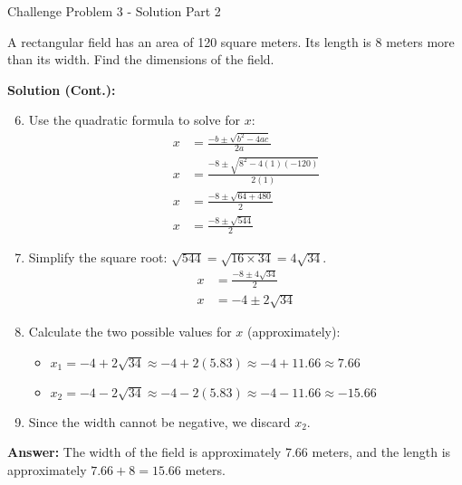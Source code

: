\documentclass[aspectratio=169]{beamer}
\begin{document}
\begin{frame}{Challenge Problem 3 - Solution Part 2}
    \begin{tcolorbox}[colback=lightgray,colframe=accent,title=Detailed Solution (Part 2)]
        \footnotesize
        A rectangular field has an area of 120 square meters. Its length is 8 meters more than its width. Find the dimensions of the field.
        
        \textbf{Solution (Cont.):}
        \begin{enumerate}
            \setcounter{enumi}{5} %
            \setlength{\itemsep}{0.5em}
            \item Use the quadratic formula to solve for $x$:
            \begin{align*}
                x &= \frac{-b \pm \sqrt{b^2 - 4ac}}{2a} \\
                x &= \frac{-8 \pm \sqrt{8^2 - 4(1)(-120)}}{2(1)} \\
                x &= \frac{-8 \pm \sqrt{64 + 480}}{2} \\
                x &= \frac{-8 \pm \sqrt{544}}{2}
            \end{align*}
            \item Simplify the square root: $\sqrt{544} = \sqrt{16 \times 34} = 4\sqrt{34}$.
            \begin{align*}
                x &= \frac{-8 \pm 4\sqrt{34}}{2} \\
                x &= -4 \pm 2\sqrt{34}
            \end{align*}
            \item Calculate the two possible values for $x$ (approximately):
            \begin{itemize}
                \item $x_1 = -4 + 2\sqrt{34} \approx -4 + 2(5.83) \approx -4 + 11.66 \approx 7.66$
                \item $x_2 = -4 - 2\sqrt{34} \approx -4 - 2(5.83) \approx -4 - 11.66 \approx -15.66$
            \end{itemize}
            \item Since the width cannot be negative, we discard $x_2$.
        \end{enumerate}
        
        \textbf{Answer:} The width of the field is approximately 7.66 meters, and the length is approximately $7.66 + 8 = 15.66$ meters.
    \end{tcolorbox}
\end{frame}
\end{document}
